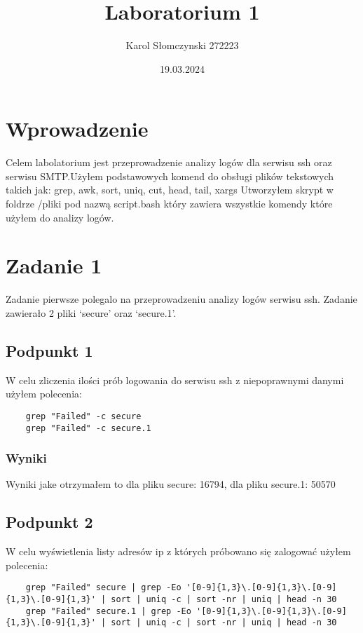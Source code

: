 \documentclass{article}
\title{Laboratorium 1}
\author{Karol Słomczynski 272223}
\date{19.03.2024}
\begin{document}
\maketitle
\tableofcontents
\newpage
\section{Wprowadzenie}
Celem labolatorium jest przeprowadzenie analizy logów dla serwisu ssh oraz serwisu SMTP.\@ Użyłem podstawowych komend do obsługi plików tekstowych takich jak: grep, awk, sort, uniq, cut, head, tail, xargs
Utworzyłem skrypt w foldrze /pliki pod nazwą script.bash który zawiera wszystkie komendy które użyłem do analizy logów.
\section{Zadanie 1}
Zadanie pierwsze polegalo na przeprowadzeniu analizy logów serwisu ssh. Zadanie zawierało 2 pliki `secure' oraz `secure.1'.
\subsection{Podpunkt 1}
W celu zliczenia ilości prób logowania do serwisu ssh z niepoprawnymi danymi użyłem polecenia:
\begin{verbatim}
    grep "Failed" -c secure
    grep "Failed" -c secure.1 
\end{verbatim}
\subsubsection{Wyniki}
Wyniki jake otrzymałem to dla pliku secure:  16794, dla pliku secure.1:  50570
\subsection{Podpunkt 2}
W celu wyświetlenia listy adresów ip z których próbowano się zalogować użyłem polecenia:
\begin{verbatim}
    grep "Failed" secure | grep -Eo '[0-9]{1,3}\.[0-9]{1,3}\.[0-9]{1,3}\.[0-9]{1,3}' | sort | uniq -c | sort -nr | uniq | head -n 30
    grep "Failed" secure.1 | grep -Eo '[0-9]{1,3}\.[0-9]{1,3}\.[0-9]{1,3}\.[0-9]{1,3}' | sort | uniq -c | sort -nr | uniq | head -n 30
\end{verbatim}
\end{document}
